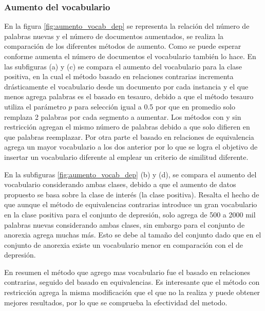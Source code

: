\subsubsection{Aumento del vocabulario}
En la figura \ref{fig:aumento_vocab_dep} se representa la relación del número de palabras nuevas y el número de documentos aumentados, %
se realiza la comparación de los diferentes métodos de aumento. Como se puede esperar conforme aumenta el número de documentos el vocabulario también lo hace. En las subfiguras (a) y (c) se compara el aumento del vocabulario para la clase positiva, en la cual el método basado en relaciones contrarias incrementa drásticamente el vocabulario desde un documento por cada instancia y el que menos agrega palabras es el basado en tesauro, debido a que el método tesauro utiliza el parámetro $p$ para selección igual a 0.5 por que en promedio solo remplaza 2 palabras por cada segmento a aumentar. Los métodos con y sin restricción agregan el mismo número de palabras debido a que solo difieren en que palabras reemplazar. Por otra parte el basado en relaciones de equivalencia agrega un mayor vocabulario a los dos anterior por lo que se logra el objetivo de insertar un vocabulario diferente al emplear un criterio de similitud diferente.

En la subfiguras \ref{fig:aumento_vocab_dep} (b) y (d), se compara el aumento del vocabulario considerando ambas clases, debido a que el aumento de datos propuesto se basa sobre la clase de interés (la clase positiva). Resalta el hecho de que aunque el método de equivalencias contrarias introduce un gran vocabulario en la clase positiva para el conjunto de depresión, solo agrega de 500 a 2000 mil palabras nuevas considerando ambas clases, sin embargo para el conjunto de anorexia agrega muchas más. Esto se debe al tamaño del conjunto dado que en el conjunto de anorexia existe un vocabulario menor en comparación con el de depresión.

En resumen el método que agrego mas vocabulario fue el basado en relaciones contrarias, seguido del basado en equivalencias. Es interesante que el método con restricción agrega la misma modificación que el que no la realiza y puede obtener mejores resultados, por lo que se comprueba la efectividad del metodo.




